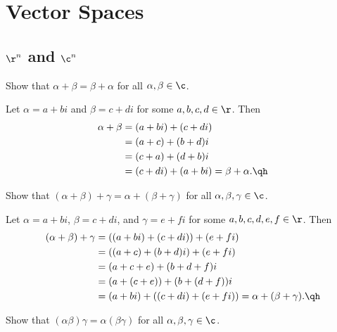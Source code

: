 \section{Vector Spaces}

\subsection{\texorpdfstring{$\r^n$ and $\c^n$}{Rn and Cn}}

\begin{exercise}[1a1]
    Show that $\alpha + \beta = \beta + \alpha$ for all $\alpha, \beta \in \c$.
\end{exercise}

\begin{sol}
    Let $\alpha = a + bi$ and $\beta = c + di$ for some $a, b, c, d \in \r$. Then
    \begin{align*}
        \alpha + \beta & = (a + bi) + (c + di) \\
        & = (a + c) + (b + d)i \\
        & = (c + a) + (d + b)i \\
        & = (c + di) + (a + bi) = \beta + \alpha. \qh
    \end{align*}
\end{sol}

\begin{exercise}[1a2]
    Show that $(\alpha + \beta) + \gamma = \alpha + (\beta + \gamma)$ for all $\alpha, \beta, \gamma \in \c$.
\end{exercise}

\begin{sol}
    Let $\alpha = a + bi$, $\beta = c + di$, and $\gamma = e + fi$ for some $a, b, c, d, e, f \in \r$. Then
    \begin{align*}
        (\alpha + \beta) + \gamma & = ((a + bi) + (c + di)) + (e + fi) \\
        & = ((a + c) + (b + d)i) + (e + fi) \\
        & = (a + c + e) + (b + d + f)i \\
        & = (a + (c + e)) + (b + (d + f))i \\
        & = (a + bi) + ((c + di) + (e + fi)) = \alpha + (\beta + \gamma). \qh
    \end{align*}
\end{sol}

\begin{exercise}[1a3]
    Show that $(\alpha\beta)\gamma = \alpha(\beta\gamma)$ for all $\alpha, \beta, \gamma \in \c$.
\end{exercise}

